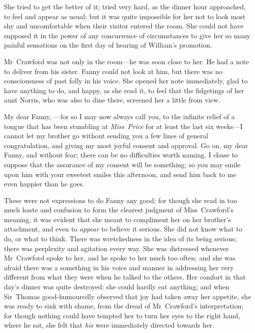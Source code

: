 She tried to get the better of it; tried very hard, as the dinner hour approached, to feel and appear as usual; but it was quite impossible for her not to look most shy and uncomfortable when their visitor entered the room. She could not have supposed it in the power of any concurrence of circumstances to give her so many painful sensations on the first day of hearing of William's promotion.

Mr~Crawford was not only in the room—he was soon close to her. He had a note to deliver from his sister. Fanny could not look at him, but there was no consciousness of past folly in his voice. She opened her note immediately, glad to have anything to do, and happy, as she read it, to feel that the fidgetings of her aunt Norris, who was also to dine there, screened her a little from view.  
\begin{mail}{}{My dear Fanny,}
—for so I may now always call you, to the infinite relief of a tongue that has been stumbling at \textit{Miss~Price}  for at least the last six weeks—I cannot let my brother go without sending you a few lines of general congratulation, and giving my most joyful consent and approval. Go on, my dear Fanny, and without fear; there can be no difficulties worth naming. I chuse to suppose that the assurance of my consent will be something; so you may smile upon him with your sweetest smiles this afternoon, and send him back to me even happier than he goes.  

\end{mail}

These were not expressions to do Fanny any good; for though she read in too much haste and confusion to form the clearest judgment of Miss~Crawford's meaning, it was evident that she meant to compliment her on her brother's attachment, and even to \textit{appear}  to believe it serious. She did not know what to do, or what to think. There was wretchedness in the idea of its being serious; there was perplexity and agitation every way. She was distressed whenever Mr~Crawford spoke to her, and he spoke to her much too often; and she was afraid there was a something in his voice and manner in addressing her very different from what they were when he talked to the others. Her comfort in that day's dinner was quite destroyed: she could hardly eat anything; and when Sir~Thomas good-humouredly observed that joy had taken away her appetite, she was ready to sink with shame, from the dread of Mr~Crawford's interpretation; for though nothing could have tempted her to turn her eyes to the right hand, where he sat, she felt that \textit{his}  were immediately directed towards her.

